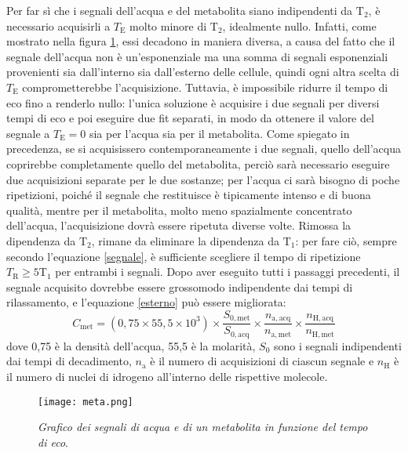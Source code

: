 \documentclass{report}
\newcommand{\figref}[1]{figura \ref{#1}}
\renewcommand{\eqref}[1]{equazione \ref{#1}}
\numberwithin{equation}{section}
\numberwithin{figure}{section}
\begin{document}
Per far sì che i segnali dell'acqua e del metabolita siano indipendenti da $\mathrm{T_2}$, è necessario acquisirli a  $T_\mathrm{E}$ molto minore di $\mathrm{T_2}$, idealmente nullo. Infatti, come mostrato nella \figref{fig:meta}, essi decadono in maniera diversa, a causa del fatto che il segnale dell'acqua non è un'esponenziale ma una somma di segnali esponenziali provenienti sia dall'interno sia dall'esterno delle cellule, quindi ogni altra scelta di $T_\mathrm{E}$ comprometterebbe l'acquisizione. Tuttavia, è impossibile ridurre il tempo di eco fino a renderlo nullo: l'unica soluzione è acquisire i due segnali per diversi tempi di eco e poi eseguire due fit separati, in modo da ottenere il valore del segnale a $T_\mathrm{E} = 0$ sia per l'acqua sia per il metabolita. Come spiegato in precedenza, se si acquisissero contemporaneamente i due segnali, quello dell'acqua coprirebbe completamente quello del metabolita, perciò sarà necessario eseguire due acquisizioni separate per le due sostanze; per l'acqua ci sarà bisogno di poche ripetizioni, poiché il segnale che restituisce è tipicamente intenso e di buona qualità, mentre per il metabolita, molto meno spazialmente concentrato dell'acqua, l'acquisizione dovrà essere ripetuta diverse volte. Rimossa la dipendenza da $\mathrm{T_2}$, rimane da eliminare la dipendenza da $\mathrm{T_1}$: per fare ciò, sempre secondo l'\eqref{segnale}, è sufficiente scegliere il tempo di ripetizione $T_\mathrm{R} \geq 5\mathrm{T_1}$ per entrambi i segnali. Dopo aver eseguito tutti i passaggi precedenti, il segnale acquisito dovrebbe essere grossomodo indipendente dai tempi di rilassamento, e l'\eqref{esterno} può essere migliorata:
\begin{equation}
    \boxed{C_\mathrm{met} = (0,75 \times 55,5 \times 10^3) \times \frac{S_{0,\mathrm{met}}}{S_{0,\mathrm{acq}}} \times \frac{n_\mathrm{a,acq}}{n_\mathrm{a,met}} \times \frac{n_\mathrm{H,acq}}{n_\mathrm{H,met}}}
\end{equation}
dove 0,75 è la densità dell'acqua, 55,5 è la molarità, $S_0$ sono i segnali indipendenti dai tempi di decadimento, $n_\mathrm{a}$ è il numero di acquisizioni di ciascun segnale e $n_\mathrm{H}$ è il numero di nuclei di idrogeno all'interno delle rispettive molecole.

\begin{figure}[htp]
\centering
\texttt{[image: meta.png]}
\caption{\label{fig:meta} \textit{Grafico dei segnali di acqua e di un metabolita in funzione del tempo di eco}.}
\end{figure}
\end{document}
